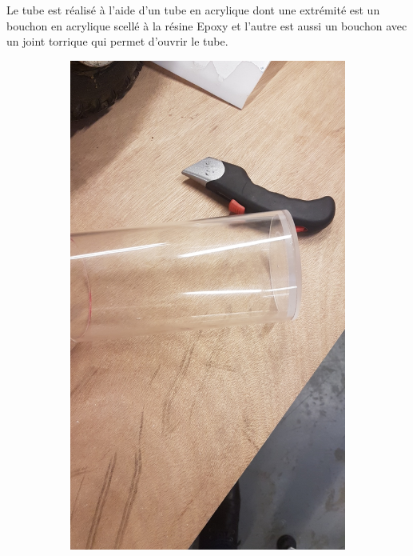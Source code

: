 \documentclass[a4paper,11pt]{report}
\begin{document}
					
					\newpage
				
		Le tube est réalisé à l'aide d'un tube en acrylique dont une extrémité est un bouchon en acrylique scellé à la résine Epoxy et l'autre est aussi un bouchon avec un joint torrique qui permet d'ouvrir le tube.
		
					\begin{figure}[!h]
						\centering
							\begin{subfigure}[b]{0.3\textwidth}
								\includegraphics[width=\textwidth]{Photos/Capture9.jpeg}

\end{subfigure}
\end{figure}
\end{document}
